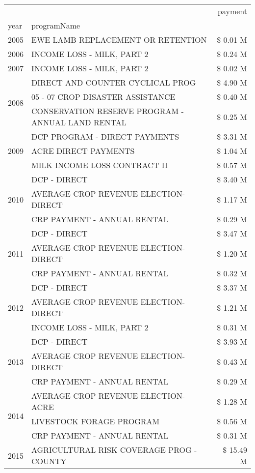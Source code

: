 \begin{tabular}{llr}
\toprule
 &  & payment \\
year & programName &  \\
\midrule
2005 & EWE LAMB REPLACEMENT OR RETENTION & \$ 0.01 M \\
\cline{1-3}
2006 & INCOME LOSS - MILK, PART 2 & \$ 0.24 M \\
\cline{1-3}
2007 & INCOME LOSS - MILK, PART 2 & \$ 0.02 M \\
\cline{1-3}
\multirow[t]{3}{*}{2008} & DIRECT AND COUNTER CYCLICAL PROG & \$ 4.90 M \\
 & 05 - 07 CROP DISASTER ASSISTANCE & \$ 0.40 M \\
 & CONSERVATION RESERVE PROGRAM - ANNUAL LAND RENTAL & \$ 0.25 M \\
\cline{1-3}
\multirow[t]{3}{*}{2009} & DCP PROGRAM - DIRECT PAYMENTS & \$ 3.31 M \\
 & ACRE DIRECT PAYMENTS & \$ 1.04 M \\
 & MILK INCOME LOSS CONTRACT II & \$ 0.57 M \\
\cline{1-3}
\multirow[t]{3}{*}{2010} & DCP - DIRECT & \$ 3.40 M \\
 & AVERAGE CROP REVENUE ELECTION-DIRECT & \$ 1.17 M \\
 & CRP PAYMENT - ANNUAL RENTAL & \$ 0.29 M \\
\cline{1-3}
\multirow[t]{3}{*}{2011} & DCP - DIRECT & \$ 3.47 M \\
 & AVERAGE CROP REVENUE ELECTION-DIRECT & \$ 1.20 M \\
 & CRP PAYMENT - ANNUAL RENTAL & \$ 0.32 M \\
\cline{1-3}
\multirow[t]{3}{*}{2012} & DCP - DIRECT & \$ 3.37 M \\
 & AVERAGE CROP REVENUE ELECTION-DIRECT & \$ 1.21 M \\
 & INCOME LOSS - MILK, PART 2 & \$ 0.31 M \\
\cline{1-3}
\multirow[t]{3}{*}{2013} & DCP - DIRECT & \$ 3.93 M \\
 & AVERAGE CROP REVENUE ELECTION-DIRECT & \$ 0.43 M \\
 & CRP PAYMENT - ANNUAL RENTAL & \$ 0.29 M \\
\cline{1-3}
\multirow[t]{3}{*}{2014} & AVERAGE CROP REVENUE ELECTION-ACRE & \$ 1.28 M \\
 & LIVESTOCK FORAGE PROGRAM & \$ 0.56 M \\
 & CRP PAYMENT - ANNUAL RENTAL & \$ 0.31 M \\
\cline{1-3}
\multirow[t]{3}{*}{2015} & AGRICULTURAL RISK COVERAGE PROG - COUNTY & \$ 15.49 M \\

\end{tabular}
